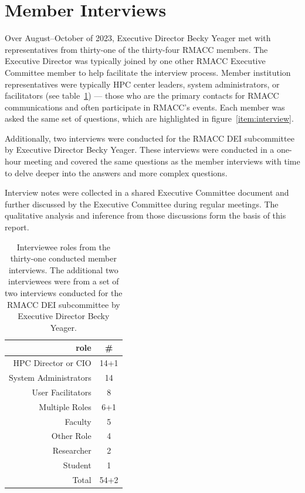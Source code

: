 \documentclass[sigconf]{acmart}
\theoremstyle{plain}
\begin{document}
\section{Member Interviews}
Over August--October of 2023, Executive Director Becky Yeager met with
representatives from thirty-one of the thirty-four RMACC members. The
Executive Director was typically joined by one other RMACC Executive
Committee member to help facilitate the interview process. Member
institution representatives were typically HPC center leaders, system
administrators, or facilitators (see table~\ref{tab:interview}) ---
those who are the primary contacts for RMACC communications and often
participate in RMACC's events.  Each member was asked the same set of
questions, which are highlighted in figure~\ref{item:interview}.

Additionally, two interviews were conducted for the RMACC DEI
subcommittee by Executive Director Becky Yeager. These interviews were
conducted in a one-hour meeting and covered the same questions as the
member interviews with time to delve deeper into the answers and more
complex questions. 

Interview notes were collected in a shared Executive Committee document
and further discussed by the Executive Committee during regular
meetings. The qualitative analysis and inference from those discussions
form the basis of this report. 

\begin{table}[ht]
  \centering
  \begin{tabular}{rc}
    role & \# \\
    \hline
    HPC Director or CIO & 14+1  \\
    System Administrators & 14 \\
    User Facilitators & 8 \\
    Multiple Roles & 6+1 \\
    Faculty & 5 \\
    Other Role & 4 \\
    Researcher & 2 \\
    Student & 1 \\
    \hline
    \hline
    Total & 54+2
  \end{tabular}
  \caption{%
  Interviewee roles from the thirty-one conducted member interviews.
  The additional two interviewees were from a set of two interviews
  conducted for the RMACC DEI subcommittee by Executive Director Becky
  Yeager.%
  }
  \label{tab:interview}
\end{table}
\end{document}

